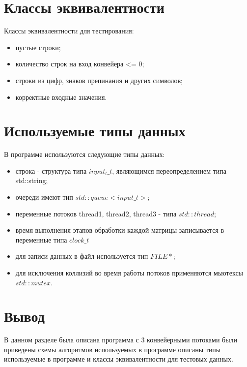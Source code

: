 \section{Классы эквивалентности}

Классы эквивалентности для тестирования:

\begin{itemize}
	\item пустые строки;
	\item количество строк на вход конвейера <= 0;
	\item строки из цифр, знаков препинания и других символов;
	\item корректные входные значения.
\end{itemize}

\section{Используемые типы данных}
В программе используются следующие типы данных:
\begin{itemize}
	\item строка - структура типа $input_t\_t$, являющимся переопределением типа std::string; 
	\item очереди имеют тип $std::queue<input\_t>$;
	\item переменные потоков thread1, thread2, thread3 - типа $std::thread$;
	\item время выполнения этапов обработки каждой матрицы записывается в переменные типа $clock\_t$ 
	\item для записи данных в файл используется тип $FILE *$;
	\item для исключения коллизий во время работы потоков применяются мьютексы $std::mutex$.
\end{itemize}


\section{Вывод}
В данном разделе была описана программа с 3 конвейерными потоками были приведены схемы алгоритмов используемых в программе описаны типы используемые в программе и классы эквивалентности для тестовых данных.